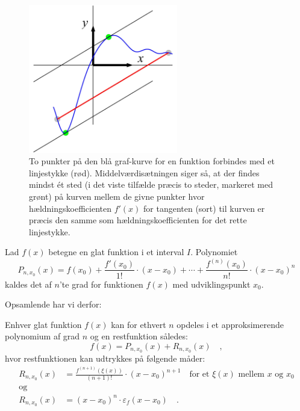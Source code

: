 \begin{figure}[ht]
\centerline{ \includegraphics[height=65mm]{plotMeanVal.pdf}}
\begin{center}
\caption{To punkter på den blå graf-kurve for en funktion forbindes med et linjestykke (rød). Middelværdisætningen siger så,
at der findes mindst \'{e}t sted (i det viste tilfælde præcis to steder, markeret med grønt) på kurven mellem de givne punkter hvor hældningskoefficienten $f'(x)$ for tangenten (sort) til kurven er præcis den samme som hældningskoefficienten for det rette linjestykke.} \label{figMeanVal}
\end{center}
\end{figure}

\begin{definition}
Lad $f(x)$ betegne en glat funktion i et interval $I$.
Polynomiet
\begin{equation}
P_{n, x_{0}}(x) = f(x_{0}) + \frac{f'(x_{0})}{1!}\cdot(x-x_{0}) + \cdots +
\frac{f^{(n)}(x_{0})}{n!}\cdot(x-x_{0})^{n}
\end{equation}
kaldes det  af $n$'te grad for funktionen $f(x)$ med udviklingspunkt $x_{0}$.
\end{definition}

Opsamlende har vi derfor:

\begin{theorem}
Enhver glat funktion $f(x)$ kan  for ethvert $n$ opdeles i et approksimerende polynomium af grad $n$ og en restfunktion således:
\begin{equation}
f(x) = P_{n, x_{0}}(x) + R_{n, x_{0}}(x) \quad ,
\end{equation}
hvor restfunktionen kan udtrykkes på følgende måder:
\begin{equation} \label{eqRestfunk}
\begin{aligned}
R_{n, x_{0}}(x) &=  \frac{f^{(n+1)}(\xi(x))}{(n+1)!}\cdot(x-x_{0})^{n+1} \quad \textrm{for et $\xi(x)$ mellem $x$ og $x_{0}$} \\
\textrm{og} \\
R_{n, x_{0}}(x) &=  (x-x_{0})^{n}\cdot \varepsilon_{f}(x-x_{0}) \quad .
\end{aligned}
\end{equation}
\end{theorem}





